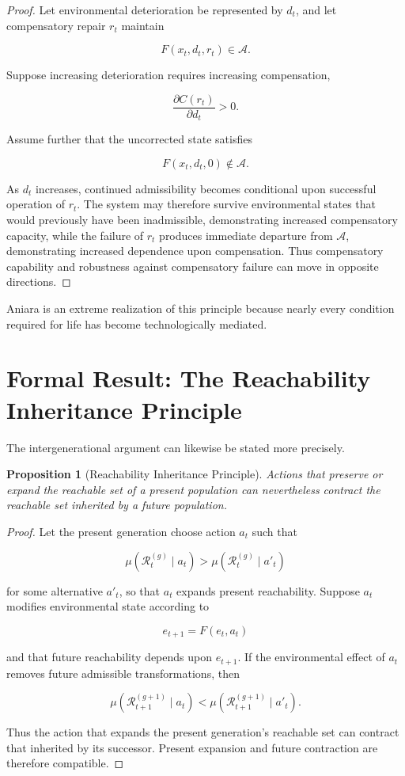 \documentclass[11pt,oneside]{book}
\newtheorem{proposition}[theorem]{Proposition}
\theoremstyle{definition}
\theoremstyle{remark}
\newcommand{\A}{\mathcal{A}}
\newcommand{\R}{\mathcal{R}}
\begin{document}
\begin{proof}
Let environmental deterioration be represented by \(d_t\), and let compensatory repair \(r_t\) maintain

\[
F(x_t,d_t,r_t)\in\A.
\]

Suppose increasing deterioration requires increasing compensation,

\[
\frac{\partial C(r_t)}{\partial d_t}>0.
\]

Assume further that the uncorrected state satisfies

\[
F(x_t,d_t,0)\notin\A.
\]

As \(d_t\) increases, continued admissibility becomes conditional upon successful operation of \(r_t\). The system may therefore survive environmental states that would previously have been inadmissible, demonstrating increased compensatory capacity, while the failure of \(r_t\) produces immediate departure from \(\A\), demonstrating increased dependence upon compensation. Thus compensatory capability and robustness against compensatory failure can move in opposite directions.
\end{proof}

Aniara is an extreme realization of this principle because nearly every condition required for life has become technologically mediated.

\section{Formal Result: The Reachability Inheritance Principle}

The intergenerational argument can likewise be stated more precisely.

\begin{proposition}[Reachability Inheritance Principle]
Actions that preserve or expand the reachable set of a present population can nevertheless contract the reachable set inherited by a future population.
\end{proposition}

\begin{proof}
Let the present generation choose action \(a_t\) such that

\[
\mu(\R_t^{(g)}\mid a_t)
>
\mu(\R_t^{(g)}\mid a'_t)
\]

for some alternative \(a'_t\), so that \(a_t\) expands present reachability. Suppose \(a_t\) modifies environmental state according to

\[
e_{t+1}=F(e_t,a_t)
\]

and that future reachability depends upon \(e_{t+1}\). If the environmental effect of \(a_t\) removes future admissible transformations, then

\[
\mu(\R_{t+1}^{(g+1)}\mid a_t)
<
\mu(\R_{t+1}^{(g+1)}\mid a'_t).
\]

Thus the action that expands the present generation's reachable set can contract that inherited by its successor. Present expansion and future contraction are therefore compatible.
\end{proof}
\end{document}
